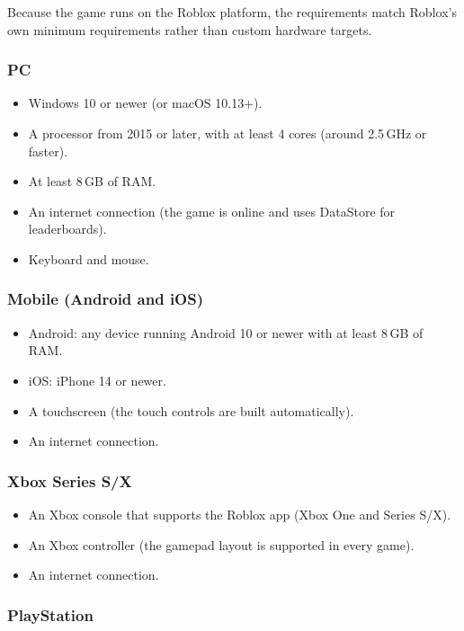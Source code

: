 \documentclass[12pt,letterpaper]{article}
\begin{document}
Because the game runs on the Roblox platform, the requirements match Roblox's own minimum requirements rather than custom hardware targets.

\subsubsection{PC}

\begin{itemize}
  \item Windows 10 or newer (or macOS 10.13+).
  \item A processor from 2015 or later, with at least 4 cores (around 2.5\,GHz or faster).
  \item At least 8\,GB of RAM.
  \item An internet connection (the game is online and uses DataStore for leaderboards).
  \item Keyboard and mouse.
\end{itemize}

\subsubsection{Mobile (Android and iOS)}

\begin{itemize}
  \item Android: any device running Android 10 or newer with at least 8\,GB of RAM.
  \item iOS: iPhone 14 or newer.
  \item A touchscreen (the touch controls are built automatically).
  \item An internet connection.
\end{itemize}

\subsubsection{Xbox Series S/X}

\begin{itemize}
  \item An Xbox console that supports the Roblox app (Xbox One and Series S/X).
  \item An Xbox controller (the gamepad layout is supported in every game).
  \item An internet connection.
\end{itemize}

\subsubsection{PlayStation}
\end{document}
